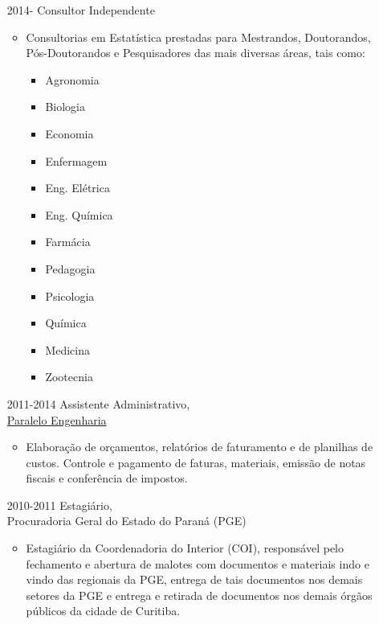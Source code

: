 \documentclass[12pt]{article}
\begin{document}
\begin{itemize}
 \item[2014-] Consultor Independente
  \begin{itemize}
   \item Consultorias em Estat\'{i}stica prestadas para Mestrandos,
         Doutorandos, P\'{o}s-Doutorandos e Pesquisadores das mais
         diversas \'{a}reas, tais como:
    \begin{multicols}{4}
      \begin{itemize}
      \item Agronomia
      \item Biologia
      \item Economia
      \item Enfermagem
      \item Eng. El\'{e}trica
      \item Eng. Qu\'{i}mica
      \item Farm\'{a}cia
      \item Pedagogia
      \item Psicologia
      \item Qu\'{i}mica
      \item Medicina
      \item Zootecnia
     \end{itemize}
    \end{multicols}
  \end{itemize}
\end{itemize}

\begin{itemize}
 \item[2011-2014] Assistente Administrativo,\\
                  \href{https://paralelo.eng.br/}{\color{blue}Paralelo Engenharia}
  \begin{itemize}
   \item Elabora\c{c}\~{a}o de or\c{c}amentos, relat\'{o}rios de
         faturamento e de planilhas de custos. Controle e pagamento de
         faturas, materiais, emiss\~{a}o de notas fiscais e
         confer\^{e}ncia de impostos.
  \end{itemize}

 \item[2010-2011] Estagi\'{a}rio,\\
                  Procuradoria Geral do Estado do Paran\'{a} (PGE)
  \begin{itemize}
   \item Estagi\'{a}rio da Coordenadoria do Interior (COI),
         respons\'{a}vel pelo fechamento e abertura de malotes com
         documentos e materiais indo e vindo das regionais da PGE,
         entrega de tais documentos nos demais setores da PGE e entrega
         e retirada de documentos nos demais \'{o}rg\~{a}os p\'{u}blicos
         da cidade de Curitiba.
  \end{itemize}
\end{itemize}
\end{document}
